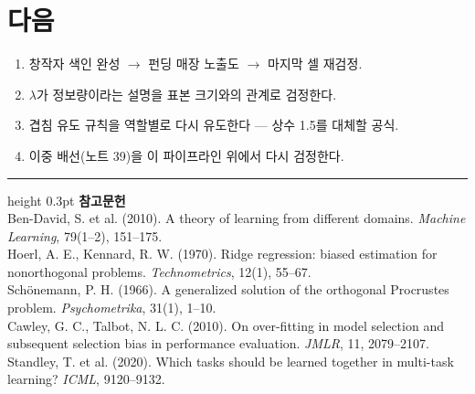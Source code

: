 \documentclass[10pt]{article}
\begin{document}
\section{다음}

\begin{enumerate}[leftmargin=1.3em,itemsep=0.15em]
\item 창작자 색인 완성 $\to$ 펀딩 매장 노출도 $\to$ 마지막 셀 재검정.
\item $\lambda$가 정보량이라는 설명을 표본 크기와의 관계로 검정한다.
\item 겹침 유도 규칙을 역할별로 다시 유도한다 --- 상수 1.5를 대체할 공식.
\item 이중 배선(노트 39)을 이 파이프라인 위에서 다시 검정한다.
\end{enumerate}

\vspace{0.6em}
\hrule height 0.3pt
\vspace{0.5em}
{\footnotesize
\textbf{참고문헌}\\[0.3em]
Ben-David, S. et al. (2010). A theory of learning from different domains.
\emph{Machine Learning}, 79(1--2), 151--175.\\[0.15em]
Hoerl, A. E., Kennard, R. W. (1970). Ridge regression: biased estimation for
nonorthogonal problems. \emph{Technometrics}, 12(1), 55--67.\\[0.15em]
Schönemann, P. H. (1966). A generalized solution of the orthogonal Procrustes
problem. \emph{Psychometrika}, 31(1), 1--10.\\[0.15em]
Cawley, G. C., Talbot, N. L. C. (2010). On over-fitting in model selection and
subsequent selection bias in performance evaluation. \emph{JMLR}, 11, 2079--2107.\\[0.15em]
Standley, T. et al. (2020). Which tasks should be learned together in multi-task
learning? \emph{ICML}, 9120--9132.
}
\end{document}
